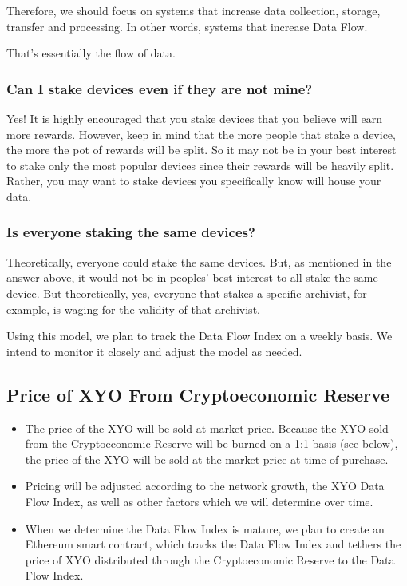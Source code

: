 \documentclass{article}
\begin{document}
Therefore, we should focus on systems that increase data collection, storage, transfer and processing. In other words, systems that increase Data Flow. 

That’s essentially the flow of data. 

\subsubsection{Can I stake devices even if they are not mine?}
Yes! It is highly encouraged that you stake devices that you believe will earn more rewards. However, keep in mind that the more people that stake a device, the more the pot of rewards will be split. So it may not be in your best interest to stake only the most popular devices since their rewards will be heavily split. Rather, you may want to stake devices you specifically know will house your data.

\subsubsection{Is everyone staking the same devices?}
Theoretically, everyone could stake the same devices. But, as mentioned in the answer above, it would not be in peoples' best interest to all stake the same device. But theoretically, yes, everyone that stakes a specific archivist, for example, is waging for the validity of that archivist.

Using this model, we plan to track the Data Flow Index on a weekly basis. We intend to monitor it closely and adjust the model as needed.

\subsection{Price of XYO From Cryptoeconomic Reserve}

\begin{itemize}
  \item The price of the XYO will be sold at market price. Because the XYO sold from the Cryptoeconomic Reserve will be burned on a 1:1 basis (see below), the price of the XYO will be sold at the market price at time of purchase.
  \item Pricing will be adjusted according to the network growth, the XYO Data Flow Index, as well as other factors which we will determine over time.
  \item When we determine the Data Flow Index is mature, we plan to create an Ethereum smart contract, which tracks the Data Flow Index and tethers the price of XYO distributed through the Cryptoeconomic Reserve to the Data Flow Index.
\end{itemize}
\end{document}
